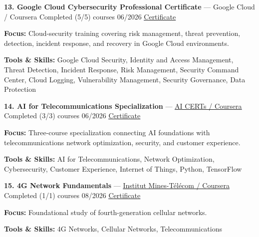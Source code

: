\documentclass[9pt,letterpaper]{extarticle}
\begin{document}
\vspace{2pt}
\noindent\textbf{13. Google Cloud Cybersecurity Professional Certificate} {\small --- Google Cloud / Coursera \textbar{} Completed (5/5) courses \textbar{} 06/2026 \textbar{} \textcolor{blue}{\underline{\href{https://waseemraza844.github.io/portfolio/certificates/cyber-security/google-cloud/google-cloud-cybersecurity-certificate.pdf}{Certificate}}}}\par
\textbf{Focus:} Cloud-security training covering risk management, threat prevention, detection, incident response, and recovery in Google Cloud environments.\par
{\small\textbf{Tools \& Skills:} Google Cloud Security, Identity and Access Management, Threat Detection, Incident Response, Risk Management, Security Command Center, Cloud Logging, Vulnerability Management, Security Governance, Data Protection\par}
\vspace{2pt}
\noindent\textbf{14. AI for Telecommunications Specialization} {\small --- \textcolor{blue}{\underline{\href{https://coursera.org/verify/specialization/D8Y6MVC0XM51}{AI CERTs / Coursera}}} \textbar{} Completed (3/3) courses \textbar{} 06/2026 \textbar{} \textcolor{blue}{\underline{\href{https://waseemraza844.github.io/portfolio/certificates/wireless/ai-for-telecom.pdf}{Certificate}}}}\par
\textbf{Focus:} Three-course specialization connecting AI foundations with telecommunications network optimization, security, and customer experience.\par
{\small\textbf{Tools \& Skills:} AI for Telecommunications, Network Optimization, Cybersecurity, Customer Experience, Internet of Things, Python, TensorFlow\par}
\vspace{2pt}
\noindent\textbf{15. 4G Network Fundamentals} {\small --- \textcolor{blue}{\underline{\href{https://coursera.org/verify/DLW1YN474VZJ}{Institut Mines-Télécom / Coursera}}} \textbar{} Completed (1/1) courses \textbar{} 08/2026 \textbar{} \textcolor{blue}{\underline{\href{https://waseemraza844.github.io/portfolio/certificates/wireless/4g-network-fundamentals.pdf}{Certificate}}}}\par
\textbf{Focus:} Foundational study of fourth-generation cellular networks.\par
{\small\textbf{Tools \& Skills:} 4G Networks, Cellular Networks, Telecommunications\par}
\end{document}
